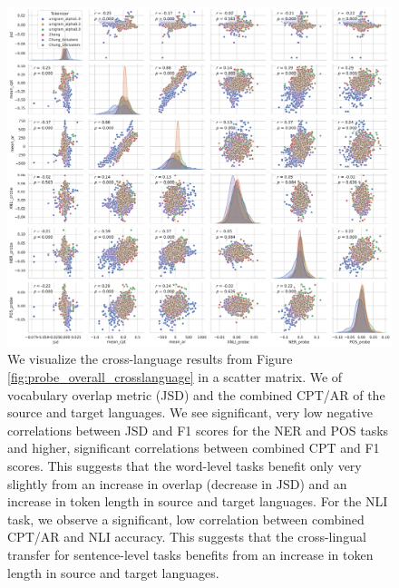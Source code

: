 \begin{figure}[H]
    \centering
    \includegraphics[width=\textwidth]{figures/probe_detailed_crosslanguage_scattermatrix.pdf}
    \caption{We visualize the cross-language results from Figure \ref{fig:probe_overall_crosslanguage} in a scatter matrix. We  of vocabulary overlap metric (JSD) and the combined CPT/AR of the source and target languages. We see significant, very low negative correlations between JSD and F1 scores for the NER and POS tasks and higher, significant correlations between combined CPT and F1 scores. This suggests that the word-level tasks benefit only very slightly from an increase in overlap (decrease in JSD) and an increase in token length in source and target languages. For the NLI task, we observe a significant, low correlation between combined CPT/AR and NLI accuracy. This suggests that the cross-lingual transfer for sentence-level tasks benefits from an increase in token length in source and target languages.}
    \label{fig:probe_overall_crosslanguage_scattermatrix}
\end{figure}
